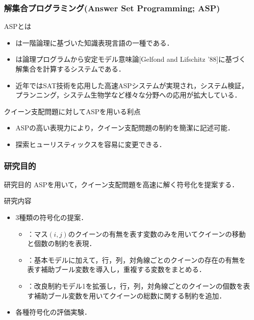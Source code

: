 \documentclass[dvipdfmx,10pt]{beamer}
\begin{document}
%
%

 \begin{frame}\frametitle{解集合プログラミング(Answer Set Programming; ASP)}
  \begin{block}{ASPとは}
   \begin{itemize}
    \item {}は一階論理に基づいた知識表現言語の一種である．
    \item {}は論理プログラムから安定モデル意味論[Gelfond and Lifschitz '88]に基づく解集合を計算するシステムである．
    \item 近年ではSAT技術を応用した高速ASPシステムが実現され，システム検証，プランニング，システム生物学など様々な分野への応用が拡大している．
   \end{itemize}
  \end{block}
  \begin{alertblock}{クイーン支配問題に対してASPを用いる利点}
   \begin{itemize}
    \item ASPの高い表現力により，クイーン支配問題の制約を簡潔に記述可能．
    \item 探索ヒューリスティックスを容易に変更できる．
   \end{itemize}
  \end{alertblock}
 \end{frame}
 
%

\begin{frame}\frametitle{研究目的}
 \begin{alertblock}{研究目的}
  ASPを用いて，クイーン支配問題を高速に解く符号化を提案する．
 \end{alertblock}
 \begin{block}{研究内容}
  \begin{itemize}
   \item 3種類の符号化の提案．
	 \begin{itemize}
	  \item {}：マス$(i,j)$のクイーンの有無を表す変数のみを用いてクイーンの移動と個数の制約を表現．\vspace{2mm}
	  \item {}：基本モデルに加えて，行，列，対角線ごとのクイーンの存在の有無を表す補助ブール変数を導入し，重複する変数をまとめる．\vspace{2mm}
	  \item {}：改良制約モデル1を拡張し，行，列，対角線ごとのクイーンの個数を表す補助ブール変数を用いてクイーンの総数に関する制約を追加．\vspace{2mm}
	 \end{itemize}
   \item 各種符号化の評価実験．
  \end{itemize}
 \end{block}
\end{frame}
\end{document}

